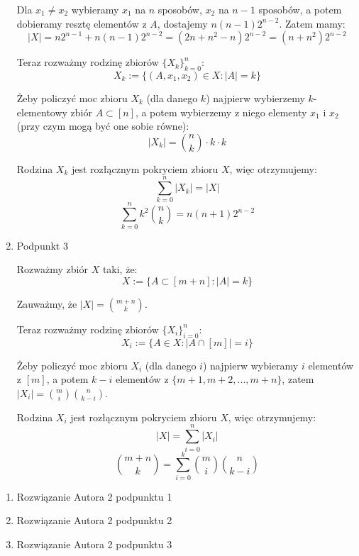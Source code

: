 \documentclass{mwart}
\begin{document}
\begin{mdframed}
\begin{enumerate}
              Dla $x_1 \neq x_2$ wybieramy $x_1$ na $n$ sposobów, $x_2$ na $n-1$ sposobów, a potem dobieramy resztę elementów z $A$,
              dostajemy $n(n-1)2^{n-2}$.
              Zatem mamy:
              \[|X| = n2^{n-1} + n(n-1)2^{n-2} = (2n + n^2 - n)2^{n-2} = (n + n^2)2^{n-2}\]

              Teraz rozważmy rodzinę zbiorów $\{X_k\}_{k=0}^n$:
              \[X_k := \{(A, x_1, x_2) \in X : |A| = k\}\]

              Żeby policzyć moc zbioru $X_k$ (dla danego $k$) najpierw wybierzemy $k$-elementowy zbiór $A \subset [n]$, a potem wybierzemy z niego elementy
              $x_1$ i $x_2$ (przy czym mogą być one sobie równe):
              \[|X_k| = {n \choose k} \cdot k\cdot k\]

              Rodzina $X_k$ jest rozłącznym pokryciem zbioru $X$, więc otrzymujemy:
              \[\sum_{k=0}^{n} |X_k| = |X|\]
              \[\sum_{k=0}^{n}k^2{n \choose k}= n(n+1)2^{n-2}\]

        \item Podpunkt 3

              Rozważmy zbiór $X$ taki, że:
              \[X := \{A \subset [m + n] : |A| = k\}\]

              Zauważmy, że $|X| = {m+n \choose k}$.

              Teraz rozważmy rodzinę zbiorów $\{X_i\}_{i=0}^n$:
              \[X_i := \{A \in X : |A \cap [m]| = i\}\]

              Żeby policzyć moc zbioru $X_i$ (dla danego $i$) najpierw wybieramy $i$ elementów z $[m]$, a potem $k-i$ elementów z
              $\{m+1, m+2, ..., m+n\}$, zatem $|X_i| = {m \choose i}{n \choose k-i}$.

              Rodzina $X_i$ jest rozłącznym pokryciem zbioru $X$, więc otrzymujemy:
              \[|X| = \sum_{i=0}^{n} |X_i|\]
              \[{m+n \choose k} = \sum_{i=0}^{k}{m \choose i}{n \choose k-i}\]

    \end{enumerate}
\end{mdframed}
\begin{mdframed}
    \begin{enumerate}
        \item Rozwiązanie Autora 2 podpunktu 1
        \item Rozwiązanie Autora 2 podpunktu 2
        \item Rozwiązanie Autora 2 podpunktu 3
    \end{enumerate}
\end{mdframed}
\end{document}
